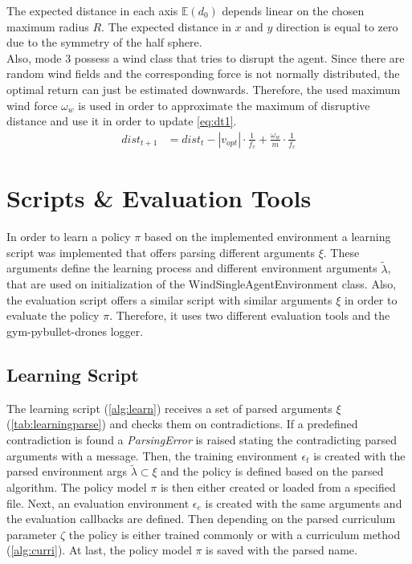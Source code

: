 The expected distance in each axis $\mathbb{E}(d_0)$ depends linear on the chosen maximum radius $R$. 
The expected distance in $x$ and $y$ direction is equal to zero due to the symmetry of the half sphere.\\
Also, mode 3 possess a wind class that tries to disrupt the agent. Since there are random wind fields and the corresponding 
force is not normally distributed, the optimal return can just be estimated downwards. 
Therefore, the used maximum wind force $\omega_w$ is used in order to approximate the maximum of disruptive distance and use it in order to update \cref{eq:dt1}.
\begin{align}
	dist_{t+1} &= dist_t - | v_{opt} | \cdot \frac{1}{f_c} + \frac{\omega_w}{m} \cdot \frac{1}{f_c}
\end{align}
\newpage



\newpage

\section{Scripts \& Evaluation Tools} \label{sec:scripts}
In order to learn a policy $\pi$ based on the implemented environment a learning script was implemented that offers parsing different arguments $\xi$. 
These arguments define the learning process and different environment arguments $\tilde{\lambda}$, that are used on initialization of the WindSingleAgentEnvironment class.
Also, the evaluation script offers a similar script with similar arguments $\xi$ in order to evaluate the policy $\pi$.
Therefore, it uses two different evaluation tools and the gym-pybullet-drones logger. 


\subsection{Learning Script}
The learning script (\cref{alg:learn}) receives a set of parsed arguments $\xi$ (\cref{tab:learningparse}) and checks them on contradictions. 
If a predefined contradiction is found a \emph{ParsingError} is raised stating the contradicting parsed arguments with a message.
Then, the training environment $\epsilon_t$ is created with the parsed environment args $\tilde{\lambda} \subset \xi$ and the policy 
is defined based on the parsed algorithm. The policy model $\pi$ is then either created or loaded from a specified file. 
Next, an evaluation environment $\epsilon_e$ is created with the same arguments and the evaluation callbacks are defined. 
Then depending on the parsed curriculum parameter $\zeta$ the policy is either trained commonly or with a curriculum method (\cref{alg:curri}).
At last, the policy model $\pi$ is saved with the parsed name.

